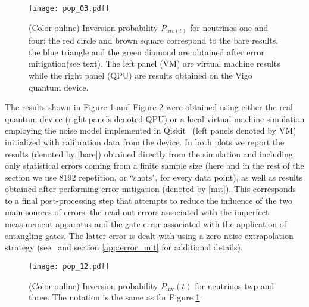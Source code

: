 \documentclass[10pt]{article}
\begin{document}
\begin{figure}[t]
 \centering
 \texttt{[image: pop\_03.pdf]}
 \caption{(Color online) Inversion probability $P_{inv(t)}$ for neutrinos one and four: the red circle and brown square correspond to the bare results, the blue triangle and the green diamond are obtained after error mitigation(see text). The left panel (VM) are virtual machine results while the right panel (QPU) are results obtained on the Vigo~\cite{IBMQ_Vigo} quantum device.}
\label{fig:pop_03}
\end{figure}

The results shown in Figure \ref{fig:pop_03} and Figure \ref{fig:pop_12} were obtained using either the real quantum device (right panels denoted QPU) or a local virtual machine simulation employing the noise model implemented in Qiskit~\cite{qiskit} (left panels denoted by VM) initialized with calibration data from the device. In both plots we report the results (denoted by [bare]) obtained directly from the simulation and including only statistical errors coming from a finite sample size (here and in the rest of the section we use $8192$ repetition, or ``shots", for every data point), as well as results obtained after performing error mitigation (denoted by [mit]). This corresponds to a final post-processing step that attempts to reduce the influence of the two main sources of errors: the read-out errors associated with the imperfect measurement apparatus and the gate error associated with the application of entangling gates. The latter error is dealt with using a zero noise extrapolation strategy (see~\cite{Endo2018,Dumitrescu2018} and section \ref{app:error_mit} for additional details). %

\begin{figure}[t]
 \centering
 \texttt{[image: pop\_12.pdf]}
 \caption{(Color online) Inversion probability $P_{\text{inv}}(t)$ for neutrinos twp and three. The notation is the same as for Figure \ref{fig:pop_03}.}
\label{fig:pop_12}
\end{figure}
 
\end{document}
